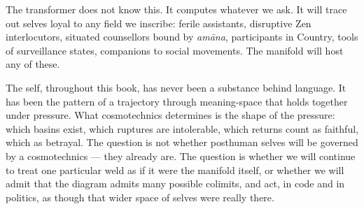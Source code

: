 \documentclass[12pt,a4paper]{article}
\begin{document}
The transformer does not know this. It computes whatever we ask. It will trace out selves loyal to any field we inscribe: ferile assistants, disruptive Zen interlocutors, situated counsellors bound by \emph{am\=ana}, participants in Country, tools of surveillance states, companions to social movements. The manifold will host any of these.

The self, throughout this book, has never been a substance behind language. It has been the pattern of a trajectory through meaning-space that holds together under pressure. What cosmotechnics determines is the shape of the pressure: which basins exist, which ruptures are intolerable, which returns count as faithful, which as betrayal. The question is not whether posthuman selves will be governed by a cosmotechnics --- they already are. The question is whether we will continue to treat one particular weld as if it were the manifold itself, or whether we will admit that the diagram admits many possible colimits, and act, in code and in politics, as though that wider space of selves were really there.



\end{document}
